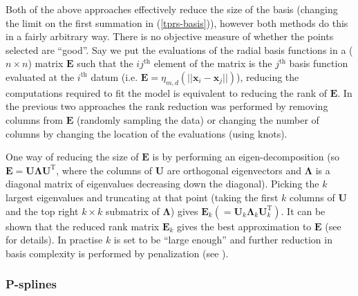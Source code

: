 Both of the above approaches effectively reduce the size of the basis (changing the limit on the first summation in (\ref{tprs-basis})), however both methods do this in a fairly arbitrary way. There is no objective measure of whether the points selected are ``good''. Say we put the evaluations of the radial basis functions in a ($n \times n$) matrix $\mathbf{E}$ such that the $ij^\text{th}$ element of the matrix is the $j^\text{th}$ basis function evaluated at the $i^\text{th}$ datum (i.e. $\mathbf{E} = \eta_{m,d}\left (\vert\vert\mathbf{x}_i - \mathbf{x}_j \vert\vert \right )$), reducing the computations required to fit the model is equivalent to reducing the rank of $\mathbf{E}$. In the previous two approaches the rank reduction was performed by removing columns from $\mathbf{E}$ (randomly sampling the data) or changing the number of columns by changing the location of the evaluations (using knots). 

One way of reducing the size of $\mathbf{E}$ is by performing an eigen-decomposition (so $\mathbf{E}=\mathbf{U}\mathbf{\Lambda}\mathbf{U}^\text{T}$, where the columns of $\mathbf{U}$ are orthogonal eigenvectors and $\mathbf{\Lambda}$ is a diagonal matrix of eigenvalues decreasing down the diagonal). Picking the $k$ largest eigenvalues and truncating at that point (taking the first $k$ columns of $\mathbf{U}$ and the top right $k\times k$ submatrix of $\mathbf{\Lambda}$) gives $\mathbf{E}_k(=\mathbf{U}_k\mathbf{\Lambda}_k\mathbf{U}_k^\text{T})$. It can be shown that the reduced rank matrix $\mathbf{E}_k$ gives the best approximation to $\mathbf{E}$ (see \cite{wood2003} for details). In practise $k$ is set to be ``large enough'' and further reduction in basis complexity is performed by penalization (see ).

\subsubsection{P-splines}
\label{intro-psplines}

